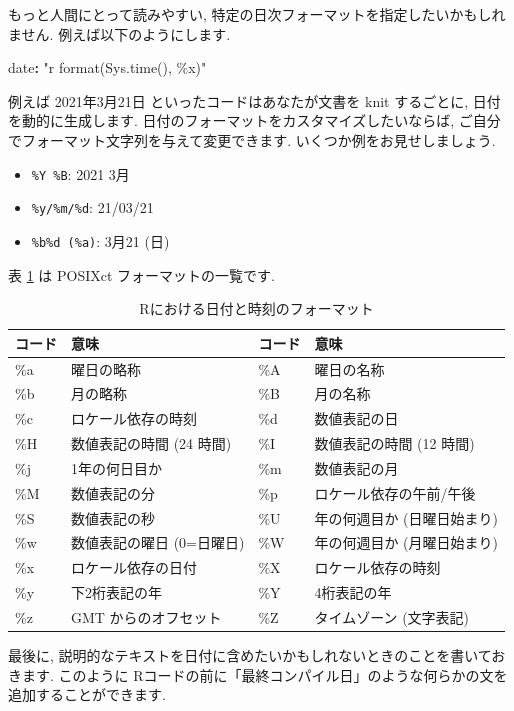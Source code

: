 \documentclass[
  11pt,
]{bxjsreport}
\newenvironment{Shaded}{\begin{snugshade}}{\end{snugshade}}
\newcommand{\AttributeTok}[1]{\textcolor[rgb]{0.77,0.63,0.00}{#1}}
\newcommand{\FunctionTok}[1]{\textcolor[rgb]{0.00,0.00,0.00}{#1}}
\newcommand{\KeywordTok}[1]{\textcolor[rgb]{0.13,0.29,0.53}{\textbf{#1}}}
\newcommand{\StringTok}[1]{\textcolor[rgb]{0.31,0.60,0.02}{#1}}
\providecommand{\tightlist}{%
  \setlength{\itemsep}{0pt}\setlength{\parskip}{0pt}}
\begin{document}
もっと人間にとって読みやすい, 特定の日次フォーマットを指定したいかもしれません. 例えば以下のようにします.

\begin{Shaded}
\begin{Highlighting}[]
\FunctionTok{date}\KeywordTok{:}\AttributeTok{ }\StringTok{"\textasciigrave{}r format(Sys.time(), \textquotesingle{}\%x\textquotesingle{})\textasciigrave{}"}
\end{Highlighting}
\end{Shaded}

例えば 2021年3月21日 といったコードはあなたが文書を knit するごとに, 日付を動的に生成します. 日付のフォーマットをカスタマイズしたいならば, ご自分でフォーマット文字列を与えて変更できます. いくつか例をお見せしましょう.

\begin{itemize}
\tightlist
\item
  \texttt{\%Y \%B}: 2021 3月
\item
  \texttt{\%y/\%m/\%d}: 21/03/21
\item
  \texttt{\%b\%d (\%a)}: 3月21 (日)
\end{itemize}

表 \ref{tab:date-format} は POSIXct フォーマットの一覧です.

\begin{table}
\caption{\label{tab:date-format} Rにおける日付と時刻のフォーマット}\tabularnewline
\begin{tabular}{llll}
\toprule
コード & 意味 & コード & 意味\tabularnewline
\midrule

\%a & 曜日の略称 & \%A & 曜日の名称\tabularnewline
\%b & 月の略称 & \%B & 月の名称\tabularnewline
\%c & ロケール依存の時刻 & \%d & 数値表記の日\tabularnewline
\%H & 数値表記の時間 (24 時間) & \%I & 数値表記の時間 (12 時間)\tabularnewline
\%j & 1年の何日目か & \%m & 数値表記の月\tabularnewline
\%M & 数値表記の分 & \%p & ロケール依存の午前/午後\tabularnewline
\%S & 数値表記の秒 & \%U & 年の何週目か (日曜日始まり)\tabularnewline
\%w & 数値表記の曜日 (0=日曜日) & \%W & 年の何週目か (月曜日始まり)\tabularnewline
\%x & ロケール依存の日付 & \%X & ロケール依存の時刻\tabularnewline
\%y & 下2桁表記の年 & \%Y & 4桁表記の年\tabularnewline
\%z & GMT からのオフセット & \%Z & タイムゾーン (文字表記)\tabularnewline
\bottomrule
\end{tabular}
\end{table}

最後に, 説明的なテキストを日付に含めたいかもしれないときのことを書いておきます. このように Rコードの前に「最終コンパイル日」のような何らかの文を追加することができます.
\end{document}
